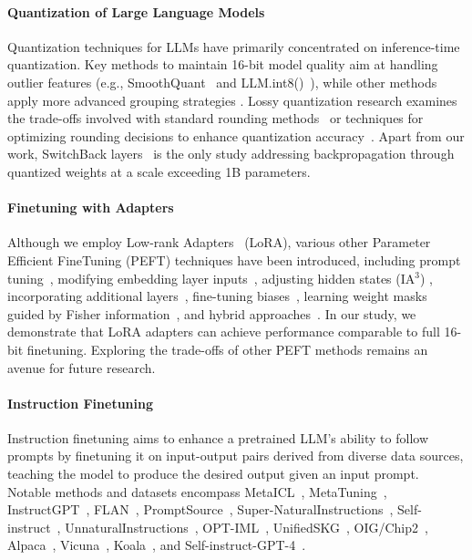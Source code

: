 \paragraph{Quantization of Large Language Models} Quantization techniques for LLMs have primarily concentrated on inference-time quantization. Key methods to maintain 16-bit model quality aim at handling outlier features (e.g., SmoothQuant~\citep{xiao2022smoothquant} and LLM.int8()~\citep{dettmers2022llm}), while other methods apply more advanced grouping strategies \citep{park2022nuqmm, yao2022zeroquant}. Lossy quantization research examines the trade-offs involved with standard rounding methods~\citep{dettmers2022case,zeng2022glm,pope2022efficiently} or techniques for optimizing rounding decisions to enhance quantization accuracy~\citep{frantar2022gptq}. Apart from our work, SwitchBack layers~\citep{wortsman2023stable} is the only study addressing backpropagation through quantized weights at a scale exceeding 1B parameters.

\paragraph{Finetuning with Adapters} Although we employ Low-rank Adapters~\citep{hu2021lora} (LoRA), various other Parameter Efficient FineTuning (PEFT) techniques have been introduced, including prompt tuning~\citep{qin2021learning,lester2021power,li2021prefix}, modifying embedding layer inputs~\citep{an2022input}, adjusting hidden states (IA$^3$) \citep{liu2022few}, incorporating additional layers~\citep{houlsby2019parameter}, fine-tuning biases~\citep{zaken2021bitfit}, learning weight masks guided by Fisher information~\citep{sung2021training}, and hybrid approaches~\citep{henderson2021compacter}. In our study, we demonstrate that LoRA adapters can achieve performance comparable to full 16-bit finetuning. Exploring the trade-offs of other PEFT methods remains an avenue for future research.

\paragraph{Instruction Finetuning} Instruction finetuning aims to enhance a pretrained LLM’s ability to follow prompts by finetuning it on input-output pairs derived from diverse data sources, teaching the model to produce the desired output given an input prompt. Notable methods and datasets encompass MetaICL~\citep{min2021metaicl}, MetaTuning~\citep{zhong2021adapting}, InstructGPT~\citep{ouyang2022training}, FLAN~\citep{wei2021finetuned,chung2022scaling}, PromptSource~\citep{bach2022promptsource}, Super-NaturalInstructions~\citep{wang2022super,sanh2021multitask}, Self-instruct~\citep{wang2022self}, UnnaturalInstructions~\citep{honovich2022unnatural}, OPT-IML~\citep{iyer2022opt}, UnifiedSKG~\citep{xie2022unifiedskg}, OIG/Chip2~\citep{laion2023}, Alpaca~\citep{alpaca}, Vicuna~\citep{vicuna2023}, Koala~\citep{koala_blogpost_2023}, and Self-instruct-GPT-4~\citep{peng2023instruction}.

